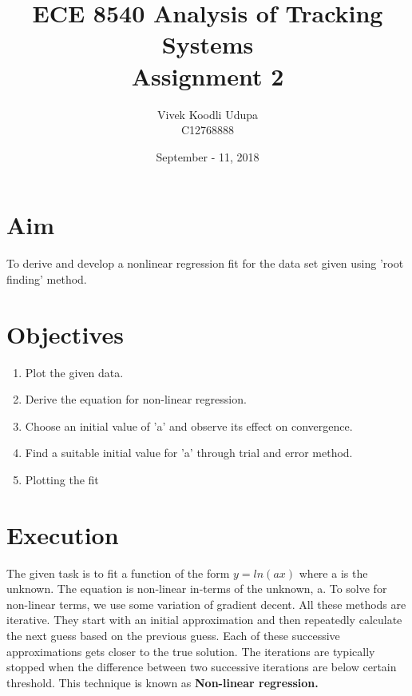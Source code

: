 \documentclass{article}
\title{ECE 8540 Analysis of Tracking Systems \\ 
	Assignment 2}
\author{Vivek Koodli Udupa \\ C12768888}
\date{September - 11, 2018 }
\begin{document}
\begin{titlepage}
\maketitle
{}%
\end{titlepage}

\section{Aim}
To derive and develop a nonlinear regression fit for the data set given using 'root finding' method. 

\section{Objectives}
\begin{enumerate}
	\item Plot the given data.
	\item Derive the equation for non-linear regression.
	\item Choose an initial value of 'a' and observe its effect on convergence.
	\item Find a suitable initial value for 'a' through trial and error method.
	\item Plotting the fit
\end{enumerate}
\section{Execution}
The given task is to fit a function of the form $y = ln(ax)$ where a is the unknown. The equation is non-linear in-terms of the unknown, a. To solve for non-linear terms, we use some variation of gradient decent. All these methods are iterative. They start with an initial approximation and then repeatedly  calculate the next guess based on the previous guess. Each of these successive approximations gets closer to the true solution. The iterations are typically stopped when the difference between two successive iterations are below certain threshold. This technique is known as \textbf{Non-linear regression.}
\end{document}

